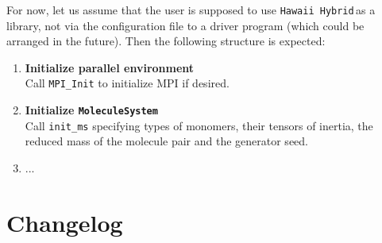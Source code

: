 \documentclass{article}
\newcommand{\libname}{\texttt{Hawaii Hybrid}\,}
\begin{document}
For now, let us assume that the user is supposed to use \libname as a library, not via the configuration file to a driver program (which could be arranged in the future). Then the following structure is expected:

\begin{enumerate}

\item \textbf{Initialize parallel environment} \\
Call \texttt{MPI\_Init} to initialize MPI if desired.

\item \textbf{Initialize \texttt{MoleculeSystem}} \\
Call \texttt{init\_ms} specifying types of monomers, their tensors of inertia, the reduced mass of the molecule pair and the generator seed.

\item ...

\end{enumerate}




\section{Changelog}
\label{sec:changelog}
\end{document}

